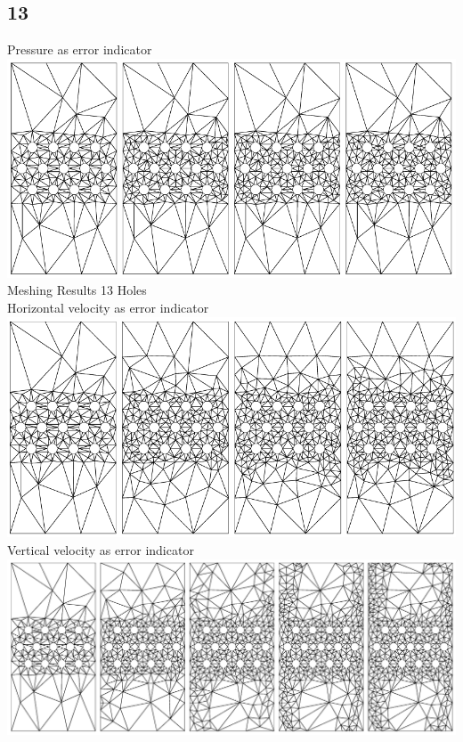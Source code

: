 \documentclass[compress]{beamer}
\begin{document}
\subsection{13}
\begin{frame}%

{\tiny Pressure as error indicator\\}
\includegraphics[height=.25\textwidth]{../plots/p_13_row.pdf}
{\Large Meshing Results 13 Holes}\\
{\tiny Horizontal velocity as error indicator\\}
\includegraphics[height=.25\textwidth]{../plots/u_13_row.pdf}\\
{\tiny Vertical velocity as error indicator\\}
\includegraphics[height=.25\textwidth]{../plots/v_13_row.pdf}
\end{frame}
\end{document}
